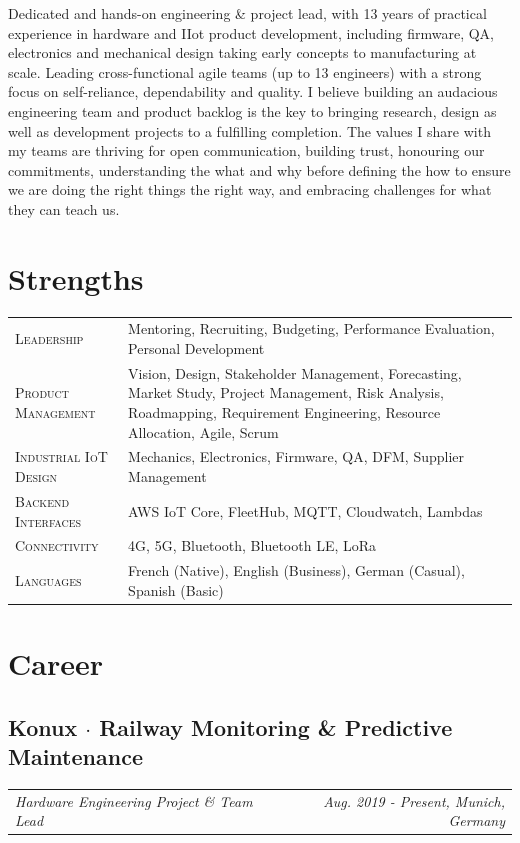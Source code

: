 \documentclass[10pt,a4paper]{moderncv}
\newcommand*{\experienceentry}[5]{
    \subsection{#1 $\cdot$ #2}
    \addvspace{-0.5em}
    {\color{color2}
    \begin{tabularx}{\textwidth}{LR}
        {\itshape #3} & {\itshape #4, #5}
    \end{tabularx}}
    \par\addvspace{1em}
    }
\begin{document}
Dedicated and hands-on engineering \& project lead, with 13 years of practical experience in hardware and IIot product development, including firmware, QA, electronics and mechanical design taking early concepts to manufacturing at scale. Leading cross-functional agile teams (up to 13 engineers) with a strong focus on self-reliance, dependability and quality. I believe building an audacious engineering team and product backlog is the key to bringing research, design as well as development projects to a fulfilling completion. The values I share with my teams are thriving for open communication, building trust, honouring our commitments, understanding the what and why before defining the how to ensure we are doing the right things the right way, and embracing challenges for what they can teach us.
    
\section{Strengths}

\begin{tabularx}{\textwidth}{>{\scshape}l@{\hskip 3.5mm}L}
    Leadership & Mentoring, Recruiting, Budgeting, Performance Evaluation, Personal Development\\
    Product Management & Vision, Design, Stakeholder Management, Forecasting, Market Study, Project Management, Risk Analysis, Roadmapping, Requirement Engineering, Resource Allocation, Agile, Scrum\\
    Industrial IoT Design & Mechanics, Electronics, Firmware, QA, DFM, Supplier Management\\
    Backend Interfaces & AWS IoT Core, FleetHub, MQTT, Cloudwatch,  Lambdas\\
    Connectivity & 4G, 5G, Bluetooth, Bluetooth LE, LoRa\\
    Languages & French (Native), English (Business), German (Casual), Spanish (Basic)
\end{tabularx}

\section{Career}

\experienceentry{Konux}{Railway Monitoring \& Predictive Maintenance}{Hardware Engineering Project \& Team Lead}{Aug. 2019 - Present}{Munich, Germany}
\end{document}
